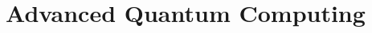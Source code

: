 \documentclass[12pt, oneside]{book}
\theoremstyle{definition}
\theoremstyle{definition}
\theoremstyle{remark}
\begin{document}
\chapter{Advanced Quantum Computing}
\end{document}
